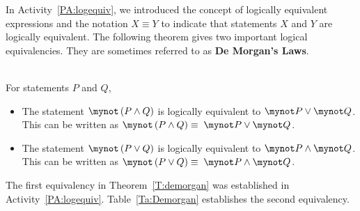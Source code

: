 In \typeu Activity~\ref*{PA:logequiv}, we introduced the concept of logically equivalent expressions and the notation $X \equiv Y$  to indicate that statements $X$  and  $Y$  are logically equivalent.  
The following theorem gives two important logical equivalencies.  They are sometimes referred to as \textbf{De Morgan's Laws}.
%

\begin{nametheorem}\label{T:demorgan} \hfill \\
For statements $P$ and $Q$, 
\begin{itemize}
    \item The statement  $\mynot  \left( {P \wedge Q} \right)$ is logically equivalent to  $\mynot  P \vee \mynot  Q$.  This can be written as  $\mynot  \left( {P \wedge Q} \right) \equiv \;\mynot  P \vee \mynot  Q$.
  \item The statement  $\mynot  \left( {P \vee Q} \right)$ is logically equivalent to  $\mynot  P \wedge \mynot  Q$.  This can be written as  $\mynot  \left( {P \vee Q} \right) \equiv \;\mynot  P \wedge \mynot  Q$.
  \end{itemize}
\end{nametheorem}
%
The first equivalency in Theorem~\ref{T:demorgan} was established in \typeu Activity~\ref*{PA:logequiv}. Table~\ref{Ta:Demorgan} establishes the second equivalency.

